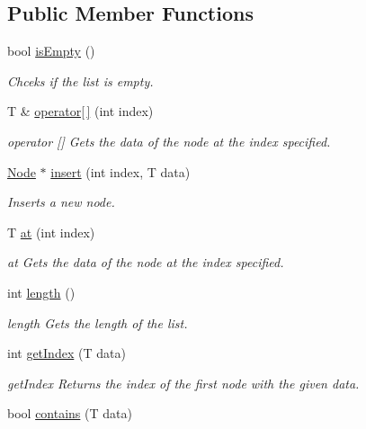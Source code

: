 \subsection*{Public Member Functions}
\begin{DoxyCompactItemize}
\item 
bool \hyperlink{classLinkedList_a7ecbb28e82117a680839ed0dc28ebdce}{is\+Empty} ()
\begin{DoxyCompactList}\small\item\em Chceks if the list is empty. \end{DoxyCompactList}\item 
T \& \hyperlink{classLinkedList_ad5254d9241ff88374dda981c68a320d7}{operator\mbox{[}$\,$\mbox{]}} (int index)
\begin{DoxyCompactList}\small\item\em operator \mbox{[}\mbox{]} Gets the data of the node at the index specified. \end{DoxyCompactList}\item 
\hyperlink{structLinkedList_1_1Node}{Node} $\ast$ \hyperlink{classLinkedList_a917c48e728e8243c38d854dc1df9d86d}{insert} (int index, T data)
\begin{DoxyCompactList}\small\item\em Inserts a new node. \end{DoxyCompactList}\item 
T \hyperlink{classLinkedList_ae3f37e8947f8fc4dd932bcf41d0344ec}{at} (int index)
\begin{DoxyCompactList}\small\item\em at Gets the data of the node at the index specified. \end{DoxyCompactList}\item 
int \hyperlink{classLinkedList_a33ccc185173763fde944238f0f269bf0}{length} ()
\begin{DoxyCompactList}\small\item\em length Gets the length of the list. \end{DoxyCompactList}\item 
int \hyperlink{classLinkedList_aa881ec96805fb6c0e4d8f8c806bff490}{get\+Index} (T data)
\begin{DoxyCompactList}\small\item\em get\+Index Returns the index of the first node with the given data. \end{DoxyCompactList}\item 
bool \hyperlink{classLinkedList_a603e1c5a0a4528d82f83b9393f83bf22}{contains} (T data)

\end{DoxyCompactItemize}

